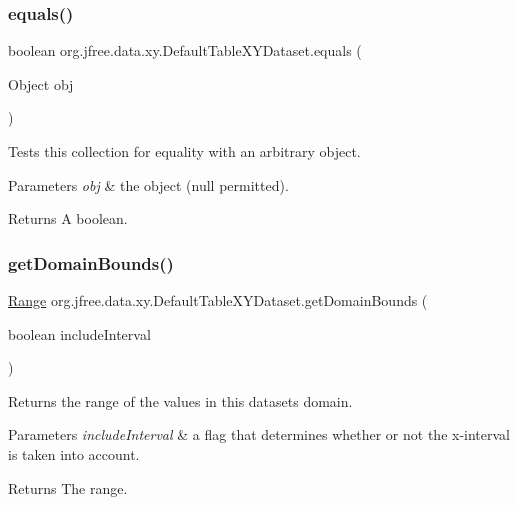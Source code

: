 \subsubsection{\texorpdfstring{equals()}{equals()}}
{\footnotesize\ttfamily boolean org.\+jfree.\+data.\+xy.\+Default\+Table\+X\+Y\+Dataset.\+equals (\begin{DoxyParamCaption}\item[{Object}]{obj }\end{DoxyParamCaption})}

Tests this collection for equality with an arbitrary object.


\begin{DoxyParams}{Parameters}
{\em obj} & the object ({\ttfamily null} permitted).\\
\hline
\end{DoxyParams}
\begin{DoxyReturn}{Returns}
A boolean. 
\end{DoxyReturn}
\mbox{\label{classorg_1_1jfree_1_1data_1_1xy_1_1_default_table_x_y_dataset_a06adf5ac38cf7beb118b2cbb64a9e10d}} 
\subsubsection{\texorpdfstring{get\+Domain\+Bounds()}{getDomainBounds()}}
{\footnotesize\ttfamily \mbox{\hyperlink{classorg_1_1jfree_1_1data_1_1_range}{Range}} org.\+jfree.\+data.\+xy.\+Default\+Table\+X\+Y\+Dataset.\+get\+Domain\+Bounds (\begin{DoxyParamCaption}\item[{boolean}]{include\+Interval }\end{DoxyParamCaption})}

Returns the range of the values in this dataset\textquotesingle{}s domain.


\begin{DoxyParams}{Parameters}
{\em include\+Interval} & a flag that determines whether or not the x-\/interval is taken into account.\\
\hline
\end{DoxyParams}
\begin{DoxyReturn}{Returns}
The range. 
\end{DoxyReturn}


